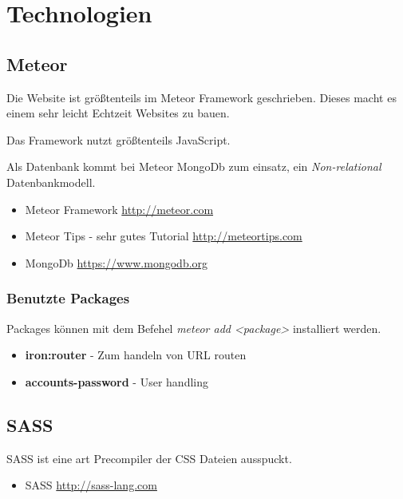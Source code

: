 \documentclass[Info_VK_Website_Dokumentation.tex]{subfiles}
\begin{document}
	
\chapter{Technologien}

\section{Meteor} 

Die Website ist größtenteils im Meteor Framework geschrieben. Dieses macht es einem sehr leicht Echtzeit Websites zu bauen.

Das Framework nutzt größtenteils JavaScript.

Als Datenbank kommt bei Meteor MongoDb zum einsatz, ein \emph{Non-relational} Datenbankmodell.

\begin{itemize}
 	\item Meteor Framework \url{http://meteor.com} \\
 	\item Meteor Tips - sehr gutes Tutorial \url{http://meteortips.com} \\
 	\item MongoDb \url{https://www.mongodb.org} \\ 
\end{itemize} 

\subsection{Benutzte Packages}

Packages können mit dem Befehel \emph{meteor add <package>} installiert werden.

\begin{itemize}
 	\item \textbf{iron:router} - Zum handeln von URL routen \\
 	\item \textbf{accounts-password} - User handling
 \end{itemize} 

\section{SASS}

SASS ist eine art Precompiler der CSS Dateien ausspuckt.

\begin{itemize}
	\item SASS \url{http://sass-lang.com} 
\end{itemize}
\end{document}
